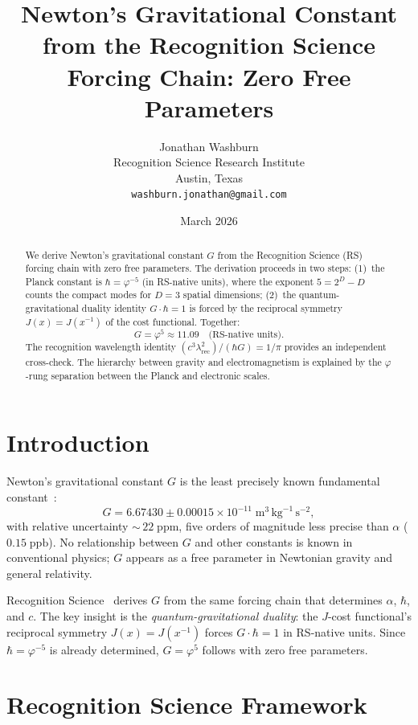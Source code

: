 \documentclass[12pt,a4paper]{article}
\title{Newton's Gravitational Constant from the Recognition Science
Forcing Chain: Zero Free Parameters}
\author{Jonathan Washburn\\
Recognition Science Research Institute\\
Austin, Texas\\
\texttt{washburn.jonathan@gmail.com}}
\date{March 2026}
\theoremstyle{definition}
\theoremstyle{remark}
\begin{document}
\maketitle

\begin{abstract}
We derive Newton's gravitational constant $G$ from the Recognition
Science (RS) forcing chain with zero free parameters.  The derivation
proceeds in two steps: (1)~the Planck constant is
$\hbar = \varphi^{-5}$ (in RS-native units), where the exponent
$5 = 2^D - D$ counts the compact modes for $D = 3$ spatial
dimensions; (2)~the quantum-gravitational duality identity
$G \cdot \hbar = 1$ is forced by the reciprocal symmetry
$J(x) = J(x^{-1})$ of the cost functional.  Together:
\begin{equation*}
  \boxed{G = \varphi^5 \approx 11.09\quad\text{(RS-native units)}.}
\end{equation*}
The recognition wavelength identity
$(c^3 \lambda_{\mathrm{rec}}^2)/(\hbar G) = 1/\pi$ provides an
independent cross-check.  The hierarchy between gravity and
electromagnetism is explained by the $\varphi$-rung separation
between the Planck and electronic scales.  \end{abstract}

\section{Introduction}

Newton's gravitational constant $G$ is the least precisely known
fundamental constant~\cite{CODATA}:
\begin{equation}
  G = 6.67430 \pm 0.00015 \times 10^{-11}\;\mathrm{m}^3\,
  \mathrm{kg}^{-1}\,\mathrm{s}^{-2},
\end{equation}
with relative uncertainty ${\sim}\,22\;\mathrm{ppm}$, five
orders of magnitude less precise than $\alpha$
($0.15\;\mathrm{ppb}$).  No relationship between $G$ and other
constants is known in conventional physics; $G$ appears as a
free parameter in Newtonian gravity and general relativity.

Recognition Science~\cite{RS_Axioms} derives $G$ from the same
forcing chain that determines $\alpha$, $\hbar$, and $c$.  The key
insight is the
\emph{quantum-gravitational duality}: the $J$-cost functional's
reciprocal symmetry $J(x) = J(x^{-1})$ forces $G \cdot \hbar = 1$
in RS-native units.  Since $\hbar = \varphi^{-5}$ is already
determined, $G = \varphi^5$ follows with zero free parameters.

\section{Recognition Science Framework}
\label{sec:framework}
\end{document}
